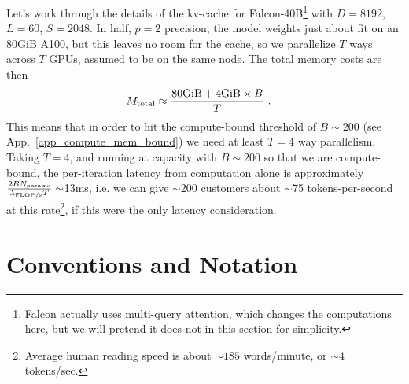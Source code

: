 \documentclass[11pt]{article}
\begin{document}
Let's work through the details of the kv-cache for Falcon-40B\footnote{Falcon actually uses
multi-query attention, which changes the computations here, but we will pretend it does not in this
section for simplicity.} with $ D=8192 $, $ L=60 $, $ S=2048 $.  In half, $ p=2 $ precision, the model weights just about fit on an
80GiB A100, but this leaves no room for the cache, so we parallelize $ T $ ways across $ T $ GPUs,
assumed to be on the same node. The total memory costs are then
\begin{align}
    M _{ {\rm  total} } &\approx  \frac{ {\rm 80GiB} + {\rm 4GiB}\times B }{ T } \ .
\end{align}
This means that in order to hit the compute-bound threshold of $ B \sim 200 $ (see
App.~\ref{app_compute_mem_bound}) we need at least $ T=4 $ way parallelism.  Taking $ T=4 $, and
running at capacity with $ B \sim 200$ so that we are compute-bound, the per-iteration latency from
computation alone is approximately $ \frac{2BN _{ {\rm params} } }{ \lambda _{ {\rm FLOP/s} } T} \sim
$13ms, i.e. we can give $ \sim $200 customers about $ \sim $75 tokens-per-second at this
rate\footnote{Average human reading speed is about $ \sim 185$ words/minute, or $ \sim 4
$tokens/sec.}, if this were the only latency consideration.











\appendix



\section{Conventions and Notation\label{app_conventions}}
\end{document}
